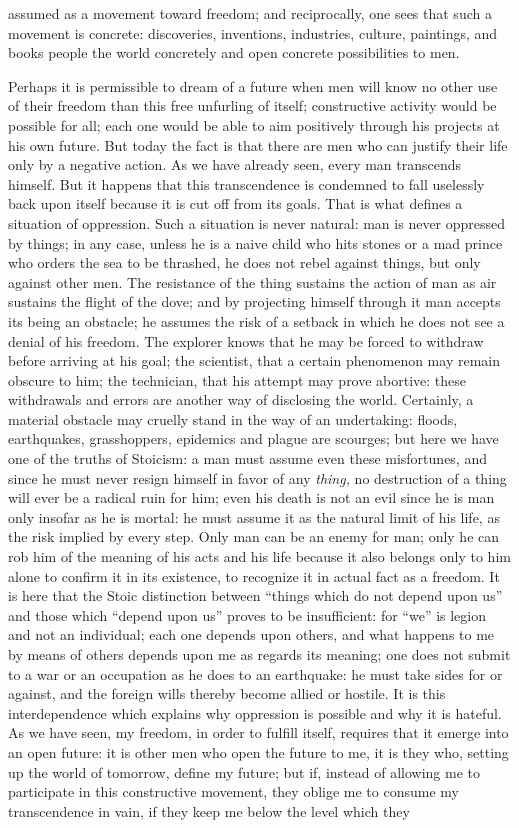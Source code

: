 \documentclass[11pt]{article}
\begin{document}
{{assumed as a movement toward freedom; and reciprocally, one sees that such a movement is concrete: discoveries, inventions, industries, culture, paintings, and books people the world concretely and open concrete possibilities to men.

Perhaps it is permissible to dream of a future when men will know no other use of their freedom than this free unfurling of itself; constructive activity would be possible for all; each one would be able to aim positively through his projects at his own future. But today the fact is that there are men who can justify their life only by a negative action. As we have already seen, every man transcends himself. But it happens that this transcendence is condemned to fall uselessly back upon itself because it is cut off from its goals. That is what defines a situation of oppression. Such a situation is never natural: man is never oppressed by things; in any case, unless he is a naive child who hits stones or a mad prince who orders the sea to be thrashed, he does not rebel against things, but only against other men. The resistance of the thing sustains the action of man as air sustains the flight of the dove; and by projecting himself through it man accepts its being an obstacle; he assumes the risk of a setback in which he does not see a denial of his freedom. The explorer knows that he may be forced to withdraw before arriving at his goal; the scientist, that a certain phenomenon may remain obscure to him; the technician, that his attempt may prove abortive: these withdrawals and errors are another way of disclosing the world. Certainly, a material obstacle may cruelly stand in the way of an undertaking: floods, earthquakes, grasshoppers, epidemics and plague are scourges; but here we have one of the truths of Stoicism: a man must assume even these misfortunes, and since he must never resign himself in favor of any \textit{thing, }no destruction of a thing will ever be a radical ruin for him; even his death is not an evil since he is man only insofar as he is mortal: he must assume it as the natural limit of his life, as the risk implied by every step. Only man can be an enemy for man; only he can rob him of the meaning of his acts and his life because it also belongs only to him alone to confirm it in its existence, to recognize it in actual fact as a freedom. It is here that the Stoic distinction between “things which do not depend upon us” and those which “depend upon us” proves to be insufficient: for “we” is legion and not an individual; each one depends upon others, and what happens to me by means of others depends upon me as regards its meaning; one does not submit to a war or an occupation as he does to an earthquake: he must take sides for or against, and the foreign wills thereby become allied or hostile. It is this interdependence which explains why oppression is possible and why it is hateful. As we have seen, my freedom, in order to fulfill itself, requires that it emerge into an open future: it is other men who open the future to me, it is they who, setting up the world of tomorrow, define my future; but if, instead of allowing me to participate in this constructive movement, they oblige me to consume my transcendence in vain, if they keep me below the level which they }}
\end{document}
